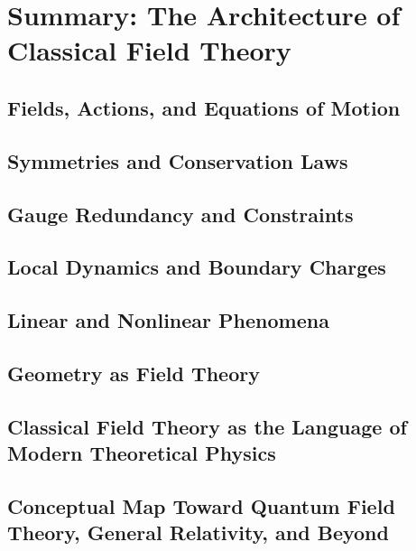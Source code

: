 \chapter{Summary: The Architecture of Classical Field Theory}

\section{Fields, Actions, and Equations of Motion}
\section{Symmetries and Conservation Laws}
\section{Gauge Redundancy and Constraints}
\section{Local Dynamics and Boundary Charges}
\section{Linear and Nonlinear Phenomena}
\section{Geometry as Field Theory}
\section{Classical Field Theory as the Language of Modern Theoretical Physics}
\section{Conceptual Map Toward Quantum Field Theory, General Relativity, and Beyond}
